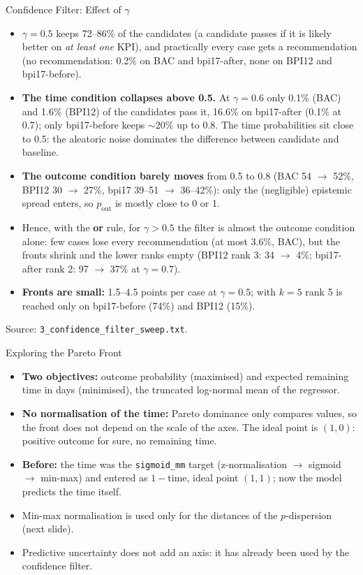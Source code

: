\documentclass[aspectratio=169]{beamer} %
\begin{document}
\begin{frame}{Confidence Filter: Effect of $\gamma$}
  \footnotesize
  \begin{itemize}
    \item \textbf{$\gamma = 0.5$} keeps 72--86\% of the candidates (a candidate passes if it is likely better on
      \emph{at least one} KPI), and practically every case gets a recommendation (no recommendation: 0.2\% on
      BAC and bpi17-after, none on BPI12 and bpi17-before).
    \item \textbf{The time condition collapses above 0.5.} At $\gamma = 0.6$ only 0.1\% (BAC) and 1.6\% (BPI12)
      of the candidates pass it, 16.6\% on bpi17-after (0.1\% at 0.7); only bpi17-before keeps $\sim$20\% up to
      0.8. The time probabilities sit close to 0.5: the aleatoric noise dominates the difference between
      candidate and baseline.
    \item \textbf{The outcome condition barely moves} from 0.5 to 0.8 (BAC 54 $\rightarrow$ 52\%, BPI12
      30 $\rightarrow$ 27\%, bpi17 39--51 $\rightarrow$ 36--42\%): only the (negligible) epistemic spread enters,
      so $p_{\text{out}}$ is mostly close to 0 or 1.
    \item Hence, with the \textbf{or} rule, for $\gamma > 0.5$ the filter is almost the outcome condition alone:
      few cases lose every recommendation (at most 3.6\%, BAC), but the fronts shrink and the lower ranks empty
      (BPI12 rank 3: 34 $\rightarrow$ 4\%; bpi17-after rank 2: 97 $\rightarrow$ 37\% at $\gamma = 0.7$).
    \item \textbf{Fronts are small:} 1.5--4.5 points per case at $\gamma = 0.5$; with $k = 5$ rank 5 is reached
      only on bpi17-before (74\%) and BPI12 (15\%).
  \end{itemize}
  {\scriptsize Source: \texttt{3\_confidence\_filter\_sweep.txt}.}
\end{frame}

\begin{frame}{Exploring the Pareto Front}
    \begin{itemize}
        \item \textbf{Two objectives:} outcome probability (\alert{maximised}) and expected remaining time in
          days (\alert{minimised}), the truncated log-normal mean of the regressor.
        \item \textbf{No normalisation of the time:} Pareto dominance only compares values, so the front
          does not depend on the scale of the axes. The ideal point is $(1, 0)$: positive outcome
          for sure, no remaining time.
        \item \textbf{Before:} the time was the \texttt{sigmoid\_mm} target (z-normalisation $\rightarrow$
          sigmoid $\rightarrow$ min-max) and entered as $1 - \text{time}$, ideal point $(1,1)$; now the
          model predicts the time itself.
        \item Min-max normalisation is used only for the distances of the $p$-dispersion (next slide).
        \item Predictive uncertainty does not add an axis: it has already been used by
          the confidence filter.
    \end{itemize}
\end{frame}
\end{document}

